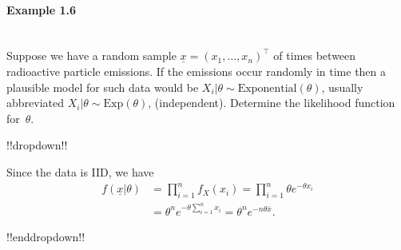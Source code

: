 \paragraph{Example 1.6}{~\\
Suppose we have a random sample $\underline{x} = (x_1, \ldots, x_n)^\top$ of times between radioactive particle emissions. If the emissions occur randomly in time then a plausible model for such data would be $X_i|\theta\sim \mathrm{Exponential}(\theta)$, usually abbreviated $X_{i}|\theta \sim \mathrm{Exp}(\theta)$, (independent). Determine the likelihood function for~$\theta$.

!!dropdown!!

Since the data is IID, we have
        \begin{align*}
            f(\underline{x}|\theta) &= \prod_{i=1}^n f_{X}(x_i) = \prod_{i=1}^n \theta e^{-\theta x_i} \\
            &= \theta^n e^{-\theta \sum_{i=1}^n x_i} = \theta^n e^{- n \theta \bar{x}}.
        \end{align*}

!!enddropdown!!}

\clearpage

